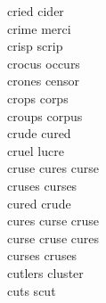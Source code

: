 cried cider\\
crime merci\\
crisp scrip\\
crocus occurs\\
crones censor\\
crops corps\\
croups corpus\\
crude cured\\
cruel lucre\\
cruse cures curse\\
cruses curses\\
cured crude\\
cures curse cruse\\
curse cruse cures\\
curses cruses\\
cutlers cluster\\
cuts scut\\

